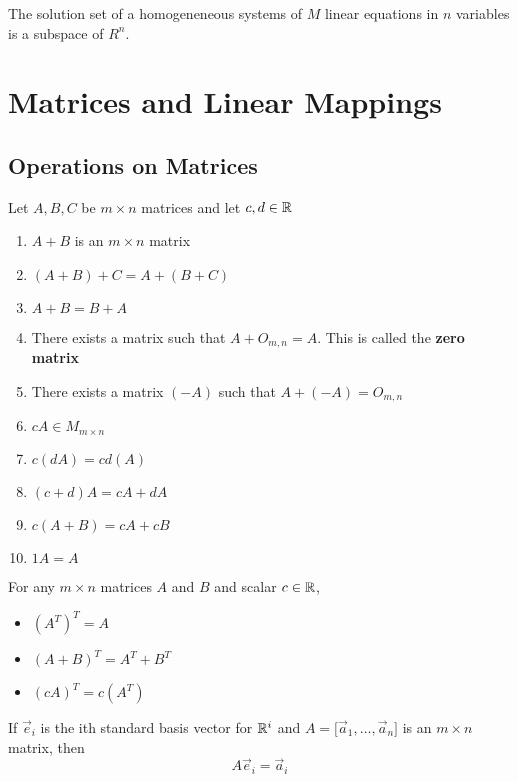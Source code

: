 \documentclass[english,12pt]{article}
\begin{document}
\begin{thrm}
The solution set of a homogeneneous systems of $M$ linear equations in $n$ variables is a subspace of $R^n$.
\end{thrm}

\section{Matrices and Linear Mappings}

\subsection{Operations on Matrices}

\begin{thrm}
Let $A,B,C$ be $m \times n$ matrices and let $c,d \in {\mathbb{R}}$
\begin{enumerate}
\item $A + B$ is an $m \times n$ matrix
\item $(A + B) + C = A + (B + C)$
\item $A + B = B + A$
\item There exists a matrix such that $A + O_{m,n} = A$. This is called the \textbf{zero matrix}
\item There exists a matrix $(-A)$ such that $A + (-A) = O_{m,n}$
\item $cA \in M_{m \times n}$
\item $c(dA) = cd(A)$
\item $(c + d)A = cA + dA$
\item $c(A + B) = cA + cB$
\item $1A = A$
\end{enumerate}
\end{thrm}

\begin{thrm}
For any $m \times n$ matrices $A$ and $B$ and scalar $c \in {\mathbb{R}}$,
\begin{itemize}
\item $(A^T)^T = A$
\item $(A+B)^T = A^T + B^T$
\item $(cA)^T = c(A^T)$
\end{itemize}
\end{thrm}

\begin{thrm}
If $\vec{e}_{i}$ is the ith standard basis vector for ${\mathbb{R}}^i$ and $A = \lbrack \vec{a}_{1},\dots,\vec{a}_{n} \rbrack$ is an $m \times n$ matrix, then
\[A \vec{e}_i = \vec{a}_{i}\]
\end{thrm}
\end{document}
